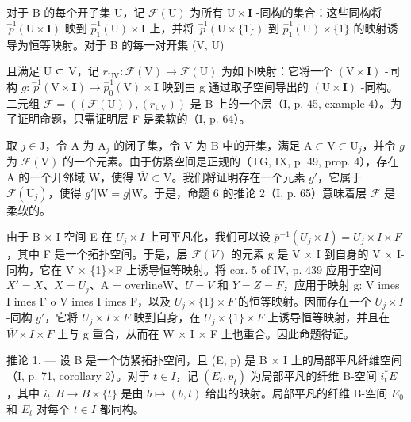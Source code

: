 对于 B 的每个开子集 U，记 \(\mathcal{F}(\mathrm{U})\) 为所有 \(\mathrm{U}\times\mathbf{I}\) -同构的集合：这些同构将 \(\stackrel{-1}{p}(\mathrm{U}\times\mathbf{I})\) 映到 \(\stackrel{-1}{p_{1}}(\mathrm{U})\times\mathbf{I}\) 上，并将 \(\stackrel{-1}{p}(\mathrm{U}\times\{1\})\) 到 \(\stackrel{-1}{p_{1}}(\mathrm{U})\times\{1\}\) 的映射诱导为恒等映射。对于 B 的每一对开集 (V, U)

且满足 U ⊂ V，记 \(r_{\mathrm{UV}} \colon \mathcal{F}(\mathrm{V}) \to \mathcal{F}(\mathrm{U})\) 为如下映射：它将一个 \((\mathrm{V} \times \mathbf{I})\) -同构 \(g \colon \stackrel{-1}{p}(\mathrm{V} \times \mathbf{I}) \to \stackrel{-1}{p_0}(\mathrm{V}) \times \mathbf{I}\) 映到由 g 通过取子空间导出的 \((\mathrm{U} \times \mathbf{I})\) -同构。二元组 \(\mathcal{F} = ((\mathcal{F}(\mathrm{U})), (r_{\mathrm{UV}}))\) 是 B 上的一个层（I, p. 45, example 4）。为了证明命题，只需证明层 F 是柔软的（I, p. 64）。

取 \(j \in \mathrm{J}\)，令 A 为 \(\mathrm{A}_j\) 的闭子集，令 V 为 B 中的开集，满足 \(\mathrm{A} \subset \mathrm{V} \subset \mathrm{U}_j\)，并令 \(g\) 为 \(\mathcal{F}(\mathrm{V})\) 的一个元素。由于仿紧空间是正规的（TG, IX, p. 49, prop. 4），存在 A 的一个开邻域 W，使得 \(\overline{\mathrm{W}} \subset \mathrm{V}\)。我们将证明存在一个元素 \(g'\)，它属于 \(\mathcal{F}(\mathrm{U}_j)\)，使得 \(g' | \mathrm{W} = g | \mathrm{W}\)。于是，命题 6 的推论 2（I, p. 65）意味着层 \(\mathcal{F}\) 是柔软的。

由于 B × I-空间 E 在 \(U_{j} \times I\) 上可平凡化，我们可以设 \(\overline{p}^{-1}(U_{j} \times I) = U_{j} \times I \times F\)，其中 F 是一个拓扑空间。于是，层 \(\mathcal{F}(V)\) 的元素 g 是 V × I 到自身的 V × I-同构，它在 V × \{1\}×F 上诱导恒等映射。将 cor. 5 of IV, p. 439 应用于空间 \(X' = X\)、\(X = U_{j}\)、A = overline{W}、\(U = V\) 和 \(Y = Z = F\)，应用于映射 g: V 	imes I 	imes F 	o V 	imes I 	imes F，以及 \(U_{j} \times \{1\} \times F\) 的恒等映射。因而存在一个 \(U_{j} \times I\)-同构 \(g'\)，它将 \(U_{j} \times I \times F\) 映到自身，在 \(U_{j} \times \{1\} \times F\) 上诱导恒等映射，并且在 \(\overline{W} \times I \times F\) 上与 g 重合，从而在 W × I × F 上也重合。因此命题得证。

推论 1. --- 设 B 是一个仿紧拓扑空间，且 (E, p) 是 B × I 上的局部平凡纤维空间（I, p. 71, corollary 2）。对于 \(t \in I\)，记 \((E_{t}, p_{t})\) 为局部平凡的纤维 B-空间 \(i_{t}^{*}E\)，其中 \(i_{t} \colon B \to B \times \{t\}\) 是由 \(b \mapsto (b, t)\) 给出的映射。局部平凡的纤维 B-空间 \(E_{0}\) 和 \(E_{t}\) 对每个 \(t \in I\) 都同构。

